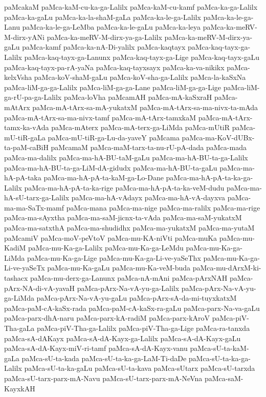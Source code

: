 {paMcakaM
paMca-kaM-cu-ka-ga-Lalilx
paMca-kaM-cu-kamf
paMca-ka-ga-Lalilx
paMca-ka-gaLu
paMca-ka-la-shaM-gaLa
paMca-ka-le-ga-Lalilx
paMca-ka-le-ga-Lanu
paMca-ka-le-ga-LeMba
paMca-ka-le-gaLu
paMca-ka-leya
paMca-ka-meRV-M-dirx-yANi
paMca-ka-meRV-M-dirx-ya-ga-Lalilx
paMca-ka-meRV-M-dirx-ya-gaLu
paMca-kamf
paMca-ka-nA-Di-yalilx
paMca-kaqtayx
paMca-kaq-tayx-ga-Lalilx
paMca-kaq-tayx-ga-Lanunx
paMca-kaq-tayx-ga-Lige
paMca-kaq-tayx-gaLu
paMca-kaq-tayx-pa-rA-yaNa
paMca-kaq-tayxsayx
paMca-ka-va-nikikx
paMca-kelxVsha
paMca-koV-shaM-gaLu
paMca-koV-sha-ga-Lalilx
paMca-la-kaSxNa
paMca-liM-ga-ga-Lalilx
paMca-liM-ga-ga-Lane
paMca-liM-ga-ga-Lige
paMca-liM-ga-rU-pa-ga-Lalilx
paMca-loVha
paMcamAH
paMca-mA-kaSxraH
paMca-mAtArx
paMca-mA-tArx-sa-mA-yukatxM
paMca-mA-tArx-sa-ma-nivx-ta-mAda
paMca-mA-tArx-sa-ma-nivx-tamf
paMca-mA-tArx-tamxkaM
paMca-mA-tArx-tamx-ka-vAda
paMca-mAterx
paMca-mA-terx-ga-LiMda
paMca-mUtiR
paMca-mU-tiR-gaLa
paMca-mU-tiR-ga-Lu-da-yaveY
paMcama
paMca-ma-KoV-dUBx-ta-paM-caBiH
paMcamaM
paMca-maM-tarx-ta-nu-rU-pA-dada
paMca-mada
paMca-ma-dalilx
paMca-ma-hA-BU-taM-gaLu
paMca-ma-hA-BU-ta-ga-Lalilx
paMca-ma-hA-BU-ta-ga-LiM-dA-gidudx
paMca-ma-hA-BU-ta-gaLu
paMca-ma-hA-pA-taka
paMca-ma-hA-pA-ta-kaM-ga-Lo-Dane
paMca-ma-hA-pA-ta-ka-ga-Lalilx
paMca-ma-hA-pA-ta-ka-rige
paMca-ma-hA-pA-ta-ka-veM-dudu
paMca-ma-hA-sU-tarx-ga-Lalilx
paMca-ma-hA-vAdayx
paMca-ma-hA-vA-dayxva
paMca-ma-ma-SaTx-mamf
paMca-mana
paMca-ma-nige
paMca-ma-ralilx
paMca-ma-rige
paMca-ma-sAyxtha
paMca-ma-saM-jicnx-ta-vAda
paMca-ma-saM-yukatxM
paMca-ma-satxthA
paMca-ma-shudidhx
paMca-ma-yukatxM
paMca-ma-yutaM
paMcamiV
paMca-moV-peVtoV
paMca-mu-KA-niVti
paMca-muKa
paMca-mu-KadiM
paMca-mu-Ka-ga-Lalilx
paMca-mu-Ka-ga-LeMdu
paMca-mu-Ka-ga-LiMda
paMca-mu-Ka-ga-Lige
paMca-mu-Ka-ga-Li-ve-yaSeThx
paMca-mu-Ka-ga-Li-ve-yaSeTx
paMca-mu-Ka-gaLu
paMca-mu-Ka-veM-buda
paMca-mu-dArxM-ki-tashacx
paMca-mu-derx-ga-Lanunx
paMca-nA-mAni
paMca-pArxNAH
paMca-pArx-NA-di-vA-yavaH
paMca-pArx-Na-vA-yu-ga-Lalilx
paMca-pArx-Na-vA-yu-ga-LiMda
paMca-pArx-Na-vA-yu-gaLu
paMca-pArx-sA-da-mi-tuyxkatxM
paMca-paM-cA-kaSx-rada
paMca-paM-cA-kaSx-ra-gaLu
paMca-parx-Na-va-gaLu
paMca-parx-dhA-naru
paMca-parx-kA-radiM
paMca-parx-kAroV
paMca-piV-Tha-gaLa
paMca-piV-Tha-ga-Lalilx
paMca-piV-Tha-ga-Lige
paMca-ra-tanxda
paMca-sA-dAKayx
paMca-sA-dA-Kayx-ga-Lalilx
paMca-sA-dA-Kayx-gaLu
paMca-sA-dA-Kayx-miV-ri-tamf
paMca-sA-dA-Kayx-vanu
paMca-sU-ta-kaM-gaLa
paMca-sU-ta-kada
paMca-sU-ta-ka-ga-LaM-Ti-daDe
paMca-sU-ta-ka-ga-Lalilx
paMca-sU-ta-ka-gaLu
paMca-sU-ta-kava
paMca-sUtarx
paMca-sU-tarxda
paMca-sU-tarx-parx-mA-Navu
paMca-sU-tarx-parx-mA-NeVna
paMca-saM-KayxkAH
}
